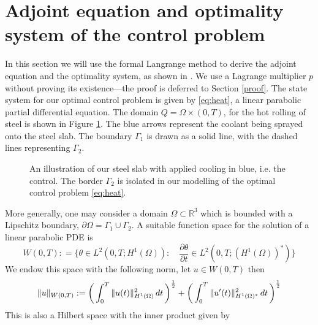 \section{Adjoint equation and optimality system of the \mbox{control} problem}

In this section we will use the formal Langrange method to derive the adjoint equation and the optimality system, as shown in \cite{optimalControl}. We use a Lagrange multiplier $p$ without proving its existence---the proof is deferred to Section \ref{proof}. The state system for our optimal control problem is given by \eqref{eq:heat}, a linear parabolic partial differential equation.
The domain $Q = \Omega \times (0,T)$, for the hot rolling of steel is shown in Figure \ref{fig:steel_slab}. The blue arrows represent the coolant being sprayed onto the steel slab. The boundary $\Gamma_1$ is drawn as a solid line, with the dashed lines representing $\Gamma_2$. 
\begin{figure}
    \centering
    
    \caption{An illustration of our steel slab with applied cooling in blue, i.e. the control. The border $\Gamma_2$ is isolated in our modelling of the optimal control problem \eqref{eq:heat}.}
    \label{fig:steel_slab}
\end{figure}

More generally, one may consider a domain $\Omega \subset \mathbb{R}^3$ which is bounded with a Lipschitz boundary, $\partial \Omega = \Gamma_1 \cup \Gamma_2$. A suitable function space for the solution of a linear parabolic PDE is 
\begin{equation}
    \label{eq:funcSpace}
    W(0,T) : = \{ \theta \in L^2(0,T;H^1(\Omega)) : \quad \frac{\partial \theta}{\partial t} \in L^2(0,T;(H^1(\Omega))^{*}) \}
\end{equation}
We endow this space with the following norm, let $u \in W(0,T)$ then 
\begin{equation*}
    \|u\|_{W(0,T)} := \bigg (\int_{0}^T\|u(t)\|^2_{H^{1}(\Omega)}\mathop{dt} \bigg ) ^{\frac{1}{2}} + \bigg (\int_{0}^T\|u'(t)\|^2_{H^{1}(\Omega)^{*}}\mathop{dt} \bigg ) ^{\frac{1}{2}}
\end{equation*}
This is also a Hilbert space with the inner product given by 

